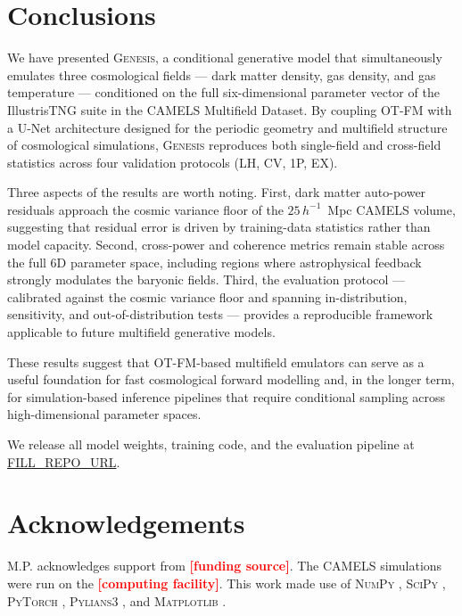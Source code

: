 \documentclass[usenatbib]{mnras}
\newcommand{\FILL}[1]{\textcolor{red}{\textbf{[#1]}}}
\begin{document}
\section{Conclusions}
\label{sec:conclusion}

We have presented \textsc{Genesis}, a conditional generative model that
simultaneously emulates three cosmological fields --- dark matter
density, gas density, and gas temperature --- conditioned on the full
six-dimensional parameter vector of the IllustrisTNG suite in the
CAMELS Multifield Dataset.
By coupling OT-FM with a U-Net architecture designed for the periodic
geometry and multifield structure of cosmological simulations,
\textsc{Genesis} reproduces both single-field
and cross-field statistics across four validation protocols (LH, CV,
1P, EX).

Three aspects of the results are worth noting.
First, dark matter auto-power residuals approach the cosmic variance
floor of the $25\,h^{-1}$~Mpc CAMELS volume, suggesting that residual
error is driven by training-data statistics rather than model capacity.
Second, cross-power and coherence metrics remain stable across the
full 6D parameter space, including regions where astrophysical
feedback strongly modulates the baryonic fields.
Third, the evaluation protocol --- calibrated against the cosmic
variance floor and spanning in-distribution, sensitivity, and
out-of-distribution tests --- provides a reproducible framework
applicable to future multifield generative models.

These results suggest that OT-FM-based multifield emulators
can serve as a useful foundation for fast cosmological forward
modelling and, in the longer term, for simulation-based inference
pipelines that require conditional sampling across high-dimensional
parameter spaces.

We release all model weights, training code, and the evaluation
pipeline at \url{FILL_REPO_URL}.

\section*{Acknowledgements}

M.P. acknowledges support from \FILL{funding source}.
The CAMELS simulations were run on the \FILL{computing facility}.
This work made use of
\textsc{NumPy} \citep{Harris2020},
\textsc{SciPy} \citep{Virtanen2020},
\textsc{PyTorch} \citep{Paszke2019},
\textsc{Pylians3} \citep{Villaescusa2018Pylians},
and \textsc{Matplotlib} \citep{Hunter2007}.
\end{document}
